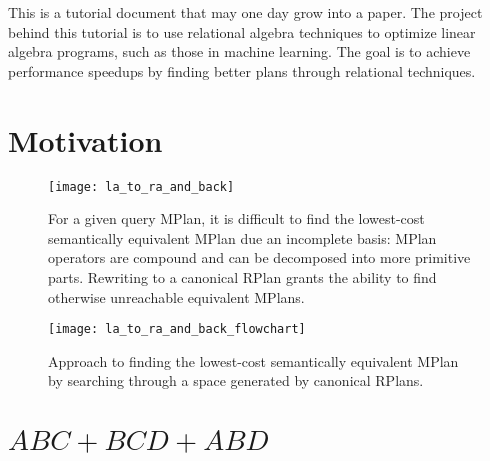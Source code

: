 \clearpage

This is a tutorial document that may one day grow into a paper.
The project behind this tutorial is to use relational algebra techniques to optimize linear algebra programs, such as those in machine learning.
The goal is to achieve performance speedups by finding better plans through relational techniques.

\section{Motivation}



\begin{figure}[tbh]
\texttt{[image: la\_to\_ra\_and\_back]}
\caption{For a given query MPlan, it is difficult to find the lowest-cost semantically equivalent MPlan due an incomplete basis: MPlan operators are compound and can be decomposed into more primitive parts. Rewriting to a canonical RPlan grants the ability to find otherwise unreachable equivalent MPlans.}
\label{fOverallPlan}
\end{figure}
\begin{figure}[tbh]
\texttt{[image: la\_to\_ra\_and\_back\_flowchart]}
\caption{Approach to finding the lowest-cost semantically equivalent MPlan by searching through a space generated by canonical RPlans.}
\label{fOverallPlanFlowchart}
\end{figure}


\section{$ABC+BCD+ABD$}

\begin{figure*}[tbh]
\end{figure*}

